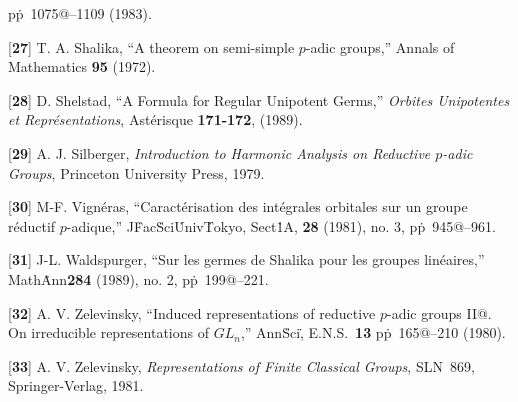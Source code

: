   pp\.~1075@--1109 (1983).
%
\item{[{\bf 27}]}
  T. A. Shalika,
  ``A theorem on semi-simple $p$-adic groups,''
  Annals of Mathematics {\bf 95} (1972).
%
\item{[{\bf 28}]}
  D. Shelstad,
  ``A Formula for Regular Unipotent Germs,''
  {\sl Orbites Unipotentes et Repr\'esentations},
  Ast\'erisque {\bf 171-172}, (1989).
%
\item{[{\bf 29}]}
  A. J. Silberger,
  {\sl Introduction to Harmonic Analysis on Reductive $p$-adic Groups},
  Princeton University Press, 1979.
%
\item{[{\bf 30}]}
  M-F. Vign\'eras,
  ``Caract\'erisation des int\'egrales orbitales sur un
     groupe r\'eductif $p$-adique,''
     J\. Fac\. Sci\. Univ\. Tokyo,
     Sect\. 1A,
     {\bf 28} (1981), no. 3, pp\.~945@--961.
%
\item{[{\bf 31}]}
  J-L. Waldspurger,
  ``Sur les germes de Shalika pour les groupes lin\'eaires,''
  Math\. Ann\. {\bf 284} (1989), no. 2, pp\.~199@--221.
%
\item{[{\bf 32}]}
  A. V. Zelevinsky,
  ``Induced representations of reductive $p$-adic groups II@.
     On irreducible representations of $GL_n$,''
  Ann\. Sci\., E.N.S.~{\bf 13}
  pp\.~165@--210 (1980).
%
\item{[{\bf 33}]}
  A. V. Zelevinsky,
  {\sl Representations of Finite Classical Groups},
  SLN~869, Springer-Verlag, 1981.

\enddocument
